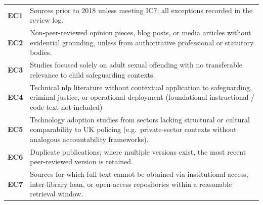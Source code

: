 \begingroup
\captionsetup{hypcap=false}
\label{tab:exclusion-criteria}
\endgroup
\begin{tcolorbox}[
  enhanced,
  breakable,
  colback=white,
  colframe=excred,
  title={\textbf{Exclusion Criteria}},
  fonttitle=\small\bfseries,
  coltitle=white,
  attach boxed title to top left={yshift=-2mm, xshift=6mm},
  boxed title style={colback=excred, colframe=excred},
  top=6pt, bottom=6pt, left=8pt, right=8pt,
  before upper={\small}
]
\setlength{\tabcolsep}{0pt}%
\begin{tabular}{%
  @{}%
  >{\bfseries\arraybackslash}p{0.9cm}%
  >{\arraybackslash}p{\dimexpr\tcbtextwidth-0.9cm\relax}%
  @{}%
}
EC1 & Sources prior to 2018 unless meeting IC7; all exceptions recorded in the review log. \\[3pt]
EC2 & Non-peer-reviewed opinion pieces, blog posts, or media articles without evidential grounding, unless from authoritative professional or statutory bodies. \\[3pt]
EC3 & Studies focused solely on adult sexual offending with no transferable relevance to child safeguarding contexts. \\[3pt]
EC4 & Technical \gls{nlp} literature without contextual application to safeguarding, criminal justice, or operational deployment (foundational instructional / code text not included)\\[3pt]
EC5 & Technology adoption studies from sectors lacking structural or cultural comparability to UK policing (e.g.\ private-sector contexts without analogous accountability frameworks). \\[3pt]
EC6 & Duplicate publications; where multiple versions exist, the most recent peer-reviewed version is retained. \\[3pt]
EC7 & Sources for which full text cannot be obtained via institutional access, inter-library loan, or open-access repositories within a reasonable retrieval window. \\
\end{tabular}
\end{tcolorbox}